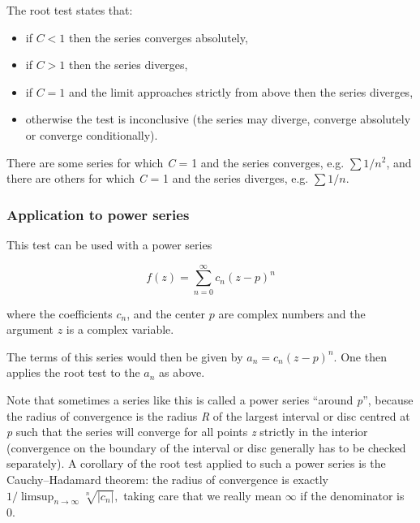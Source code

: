 The root test states that:


\begin{itemize}
    \item if $C < 1$ then the series converges absolutely,
    \item if $C > 1$ then the series diverges,
    \item if $C = 1$ and the limit approaches strictly from above then the series diverges,
    \item otherwise the test is inconclusive (the series may diverge, converge absolutely or converge conditionally).
\end{itemize}

There are some series for which \textit{C} = 1 and the series converges, e.g. $\textstyle \sum 1/{n^2}$, and there are others for which \textit{C} = 1 and the series diverges, e.g. $\textstyle\sum 1/n$.


\subsubsection{Application to power series}
\label{sss:appl-3c8a}


This test can be used with a power series


\[
f(z) = \sum _{n=0}^\infty c_n (z-p)^n
\]


where the coefficients $c_n$, and the center $p$ are complex numbers and the argument $z$ is a complex variable.


The terms of this series would then be given by $a_n = c_n (z - p) ^n$. One then applies the root test to the $a_n$ as above.


Note that sometimes a series like this is called a power series ``around \textit{p}'', because the radius of convergence is the radius \textit{R} of the largest interval or disc centred at \textit{p} such that the series will converge for all points \textit{z} strictly in the interior (convergence on the boundary of the interval or disc generally has to be checked separately). A corollary of the root test applied to such a power series is the Cauchy--Hadamard theorem: the radius of convergence is exactly $1/\limsup _{n \rightarrow \infty}{\sqrt[n]{|c_n|}},$ taking care that we really mean $\infty$ if the denominator is 0.


